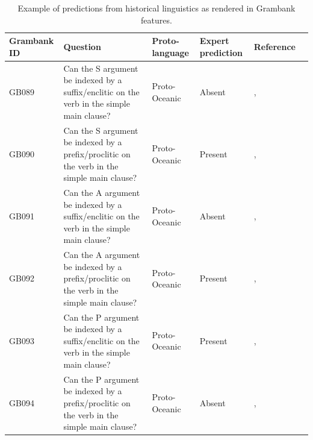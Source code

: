 \documentclass[12pt,letterpaper]{article}
\begin{document}
\begin{table}
\caption{Example of predictions from historical linguistics as rendered in Grambank features.}
\label{example_HL_prediction_table}

\begin{tabular}{|p{3cm}| p{4.5cm}|  p{2.5cm}| p{2.5cm} | p{3cm} |p{2cm}| }
\hline
\textbf{Grambank ID} & \textbf{Question} & \textbf{Proto-language} & \textbf{Expert prediction} & \textbf{Reference} \\ 
\hline
GB089  &Can the S argument be indexed by a suffix/enclitic on the verb in the simple main clause? &Proto-Oceanic &Absent & \citet[498-499]{ross2004morphosyntactic}, \citet[83]{lynchrosscrowley_proto_grammar_oceanic} \\ \hline
GB090 &Can the S argument be indexed by a prefix/proclitic on the verb in the simple main clause? &Proto-Oceanic &Present &\citet[498-499]{ross2004morphosyntactic}, \citet[83]{lynchrosscrowley_proto_grammar_oceanic}  \\ \hline
GB091 &Can the A argument be indexed by a suffix/enclitic on the verb in the simple main clause? &Proto-Oceanic &Absent &\citet[498-499]{ross2004morphosyntactic}, \citet[83]{lynchrosscrowley_proto_grammar_oceanic} \\ \hline
GB092  &Can the A argument be indexed by a prefix/proclitic on the verb in the simple main clause? &Proto-Oceanic &Present &\citet[498-499]{ross2004morphosyntactic}, \citet[83]{lynchrosscrowley_proto_grammar_oceanic}  \\ \hline
GB093  &Can the P argument be indexed by a suffix/enclitic on the verb in the simple main clause? &Proto-Oceanic &Present &\citet[498-499]{ross2004morphosyntactic}, \citet[83]{lynchrosscrowley_proto_grammar_oceanic} \\ \hline
GB094  &Can the P argument be indexed by a prefix/proclitic on the verb in the simple main clause? &Proto-Oceanic &Absent & \citet[498-499]{ross2004morphosyntactic}, \citet[83]{lynchrosscrowley_proto_grammar_oceanic} \\ \hline
\end{tabular}
\end{table}



\FloatBarrier
%
\end{document}
